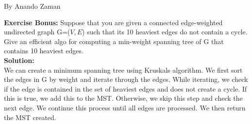 \documentclass[11pt,fleqn]{article}
\begin{document}
By Anando Zaman


\textbf{Exercise Bonus:} Suppose that you are given a connected edge-weighted undirected graph G=($V,E$) such that its 10 heaviest edges do not contain a cycle. Give an efficient algo for computing a min-weight spanning tree of G that contains 10 heaviest edges.\\

\textbf{Solution:}\\
We can create a minimum spanning tree using Kruskals algorithm. We first sort the edges in G by weight and iterate through the edges. While iterating, we check if the edge is contained in the set of heaviest edges and does not create a cycle. If this is true, we add this to the MST. Otherwise, we skip this step and check the next edge. We continue this process until all edges are processed. We then return the MST created.

	
\end{document}
